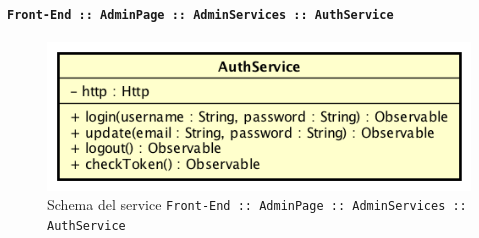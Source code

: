 \documentclass[../DefinizioneDiProdotto_v3.0.0.tex]{subfiles}
\begin{document}
				\newpage
		      	\paragraph{\texttt{Front-End :: AdminPage :: AdminServices :: AuthService}}
		      	\acapo
				\begin{figure}[!h]
					\centering
					\includegraphics[scale=0.7]{Architettura/Front-End/AdminPage/AdminServices/AuthService.png}
					\caption{Schema del service \texttt{Front-End :: AdminPage :: AdminServices :: AuthService}}
				\end{figure}
\end{document}
